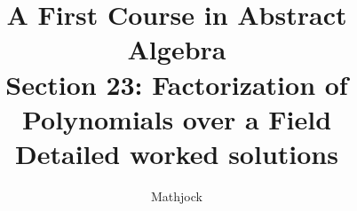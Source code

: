 
\title{\textbf{A First Course in Abstract Algebra}\\[0.3em]Section 23: Factorization of Polynomials over a Field\\[0.3em]\large Detailed worked solutions}
\author{Mathjock}
\date{}

\maketitle
\bookinfo
\tableofcontents
\clearpage
\renewcommand{\thesection}{23}
\renewcommand{\theHsection}{fraleigh.23}



